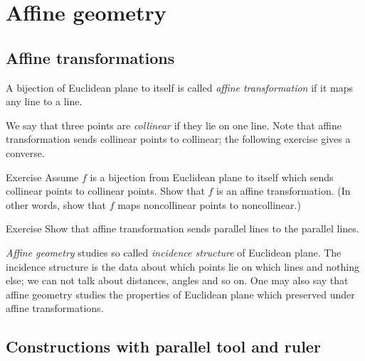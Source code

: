 
\chapter{Affine geometry}\label{chap:trans}

\section*{Affine transformations}

A bijection of Euclidean plane to itself 
is called \emph{affine transformation}
if it maps any line to a line.

We say that three points are \emph{collinear} if they lie on one line. 
Note that affine transformation sends collinear points to collinear; the following exercise gives a converse.

\begin{thm}{Exercise}\label{ex:collinear=affine}
Assume $f$ is a bijection from Euclidean plane to itself which sends collinear points to collinear points.
Show that $f$ is an affine transformation.
(In other words, show that $f$ maps noncollinear points to noncollinear.)
\end{thm}

\begin{thm}{Exercise}\label{ex:affine-par}
Show that affine transformation sends parallel lines to the parallel lines.
\end{thm}

\emph{Affine geometry} studies  so called \emph{incidence structure} of Euclidean plane.
The incidence structure is the data about which points lie on which lines and nothing else;
we can not talk about distances, angles and so on.
One may also say that affine geometry studies
the properties of Euclidean plane which preserved under affine transformations.

\section*{Constructions with parallel tool and ruler}

